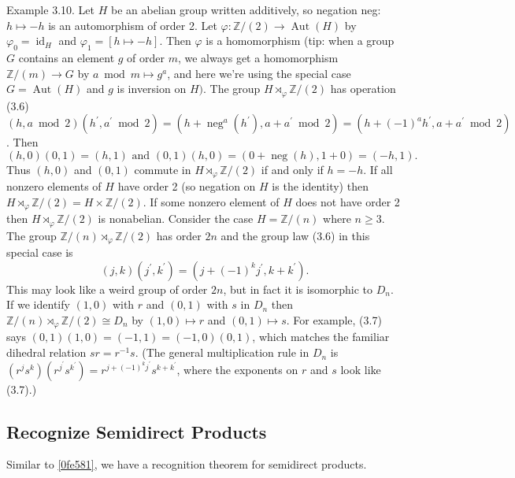 \begin{example}
Example 3.10. Let $H$ be an abelian group written additively, so negation neg: $h \mapsto -h$ is an automorphism of order 2. Let $\varphi: \mathbb{Z} /(2) \rightarrow \operatorname{Aut}(H)$ by $\varphi_0=\operatorname{id}_H$ and $\varphi_1=[h \mapsto -h]$. Then $\varphi$ is a homomorphism (tip: when a group $G$ contains an element $g$ of order $m$, we always get a homomorphism $\mathbb{Z} /(m) \rightarrow G$ by $a \bmod m \mapsto g^a$, and here we're using the special case $G=\operatorname{Aut}(H)$ and $g$ is inversion on $H)$. The group $H \rtimes_{\varphi} \mathbb{Z} /(2)$ has operation (3.6) $(h, a \bmod 2)\left(h^{\prime}, a^{\prime} \bmod 2\right)=\left(h+\operatorname{neg}^a\left(h^{\prime}\right), a+a^{\prime} \bmod 2\right)=\left(h+(-1)^a h^{\prime}, a+a^{\prime} \bmod 2\right)$. Then
\[
(h, 0)(0,1)=(h, 1) \text { and }(0,1)(h, 0)=(0+\operatorname{neg}(h), 1+0)=(-h, 1) .
\]Thus $(h, 0)$ and $(0,1)$ commute in $H \rtimes_{\varphi} \mathbb{Z} /(2)$ if and only if $h=-h$. If all nonzero elements of $H$ have order 2 (so negation on $H$ is the identity) then $H \rtimes_{\varphi} \mathbb{Z} /(2)=H \times \mathbb{Z} /(2)$. If some nonzero element of $H$ does not have order 2 then $H \rtimes_{\varphi} \mathbb{Z} /(2)$ is nonabelian.
Consider the case $H=\mathbb{Z} /(n)$ where $n \geq 3$. The group $\mathbb{Z} /(n) \rtimes_{\varphi} \mathbb{Z} /(2)$ has order $2 n$ and the group law (3.6) in this special case is
\[
(j, k)\left(j^{\prime}, k^{\prime}\right)=\left(j+(-1)^k j^{\prime}, k+k^{\prime}\right) .
\]This may look like a weird group of order $2 n$, but in fact it is isomorphic to $D_n$. If we identify $(1,0)$ with $r$ and $(0,1)$ with $s$ in $D_n$ then $\mathbb{Z} /(n) \rtimes_{\varphi} \mathbb{Z} /(2) \cong D_n$ by $(1,0) \mapsto r$ and $(0,1) \mapsto s$. For example, (3.7) says $(0,1)(1,0)=(-1,1)=(-1,0)(0,1)$, which matches the familiar dihedral relation $s r=r^{-1} s$. (The general multiplication rule in $D_n$ is $\left(r^j s^k\right)\left(r^{j^{\prime}} s^{k^{\prime}}\right)=r^{j+(-1)^k j^{\prime}} s^{k+k^{\prime}}$, where the exponents on $r$ and $s$ look like (3.7).)
\end{example}
\subsection{Recognize Semidirect Products}

Similar to \cref{0fe581}, we have a recognition theorem for semidirect products.

